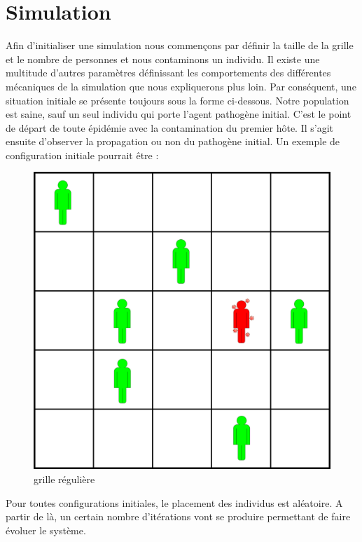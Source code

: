 \section{Simulation}

Afin d'initialiser une simulation nous commençons par définir la taille de la grille et le nombre de personnes et nous contaminons un individu. Il existe une multitude d'autres paramètres définissant les comportements des différentes mécaniques de la simulation que nous expliquerons plus loin. Par conséquent, une situation initiale se présente toujours sous la forme ci-dessous. Notre population est saine, sauf un seul individu qui porte l'agent pathogène initial. C'est le point de départ de toute épidémie avec la contamination du premier hôte. Il s'agit ensuite d'observer la propagation ou non du pathogène initial. Un exemple de configuration initiale pourrait être : \\

\begin{figure}[h]
\centering
\captionsetup{justification=centering}
\includegraphics[scale=0.5]{Images/configuration_initiale.png}
\caption{grille régulière}
\end{figure}

Pour toutes configurations initiales, le placement des individus est aléatoire. A partir de là, un certain nombre d'itérations vont se produire permettant de faire évoluer le système.

